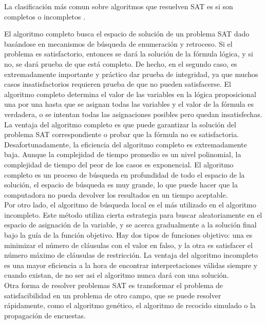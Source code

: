 \documentclass[11pt]{article}
\begin{document}
			La clasificación más comun sobre algoritmos que resuelven SAT es si son completos o incompletos \cite{a_survey_of_sat_solver}.

			El algoritmo completo busca el espacio de solución de un problema SAT dado basándose en mecanismos de búsqueda de enumeración y retroceso. 
			Si el problema es satisfactorio, entonces se dará la solución de la fórmula lógica, y si no, se dará prueba de que está completo. 
			De hecho, en el segundo caso, es extremadamente importante y práctico dar prueba de
			integridad, ya que muchos casos insatisfactorios requieren prueba de que no pueden satisfacerse. El algoritmo completo
			determina el valor de las variables en la lógica proposicional una por una hasta que se asignan todas las variables y el valor de
			la fórmula es verdadera, o se intentan todas las asignaciones posibles pero quedan insatisfechas.
			La ventaja del algoritmo completo es que puede garantizar la solución del problema SAT correspondiente 
			o probar que la fórmula no es satisfactoria. Desafortunadamente, la eficiencia del algoritmo completo es extremadamente baja.
			Aunque la complejidad de tiempo promedio es un nivel polinomial, la complejidad de tiempo del peor de los casos es exponencial.
			El algoritmo completo es un proceso de búsqueda en profundidad de todo el espacio de la solución, el espacio de búsqueda es muy grande, lo que
			puede hacer que la computadora no pueda devolver los resultados en un tiempo aceptable. \\

			Por otro lado, el algoritmo de búsqueda local es el más utilizado en el algoritmo incompleto. Este método utiliza cierta
			estrategia para buscar aleatoriamente en el espacio de asignación de la variable, y se acerca gradualmente a la solución final bajo
			la guía de la función objetivo. Hay dos tipos de funciones objetivo: una es minimizar el número de cláusulas con el valor en falso,
			y la otra es satisfacer el número máximo de cláusulas de restricción. 
			La ventaja del algoritmo incompleto es una mayor eficiencia a la hora de encontrar interpretaciones válidas siempre y cuando existan, de no ser asi
			el algoritmo nunca dará con una solución. \\

			Otra forma de resolver problemas SAT es transformar el problema de satisfacibilidad en un problema de otro
			campo, que se puede resolver rápidamente, como el algoritmo genético, el algoritmo de recocido simulado o la propagación
			de encuestas. \\
\end{document}
